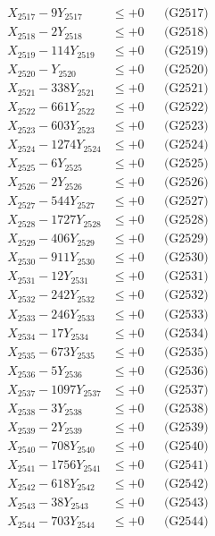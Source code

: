 \documentclass[a4paper,10pt]{article}
\begin{document}
{\begin{align}
X_{2517} - 9Y_{2517} &\leq +0 && \text{(G2517)} \\
X_{2518} - 2Y_{2518} &\leq +0 && \text{(G2518)} \\
X_{2519} - 114Y_{2519} &\leq +0 && \text{(G2519)} \\
X_{2520} - Y_{2520} &\leq +0 && \text{(G2520)} \\
\allowbreak
X_{2521} - 338Y_{2521} &\leq +0 && \text{(G2521)} \\
X_{2522} - 661Y_{2522} &\leq +0 && \text{(G2522)} \\
X_{2523} - 603Y_{2523} &\leq +0 && \text{(G2523)} \\
X_{2524} - 1274Y_{2524} &\leq +0 && \text{(G2524)} \\
X_{2525} - 6Y_{2525} &\leq +0 && \text{(G2525)} \\
X_{2526} - 2Y_{2526} &\leq +0 && \text{(G2526)} \\
X_{2527} - 544Y_{2527} &\leq +0 && \text{(G2527)} \\
X_{2528} - 1727Y_{2528} &\leq +0 && \text{(G2528)} \\
X_{2529} - 406Y_{2529} &\leq +0 && \text{(G2529)} \\
X_{2530} - 911Y_{2530} &\leq +0 && \text{(G2530)} \\
\allowbreak
X_{2531} - 12Y_{2531} &\leq +0 && \text{(G2531)} \\
X_{2532} - 242Y_{2532} &\leq +0 && \text{(G2532)} \\
X_{2533} - 246Y_{2533} &\leq +0 && \text{(G2533)} \\
X_{2534} - 17Y_{2534} &\leq +0 && \text{(G2534)} \\
X_{2535} - 673Y_{2535} &\leq +0 && \text{(G2535)} \\
X_{2536} - 5Y_{2536} &\leq +0 && \text{(G2536)} \\
X_{2537} - 1097Y_{2537} &\leq +0 && \text{(G2537)} \\
X_{2538} - 3Y_{2538} &\leq +0 && \text{(G2538)} \\
X_{2539} - 2Y_{2539} &\leq +0 && \text{(G2539)} \\
X_{2540} - 708Y_{2540} &\leq +0 && \text{(G2540)} \\
\allowbreak
X_{2541} - 1756Y_{2541} &\leq +0 && \text{(G2541)} \\
X_{2542} - 618Y_{2542} &\leq +0 && \text{(G2542)} \\
X_{2543} - 38Y_{2543} &\leq +0 && \text{(G2543)} \\
X_{2544} - 703Y_{2544} &\leq +0 && \text{(G2544)} \\

\end{align}}
\end{document}
